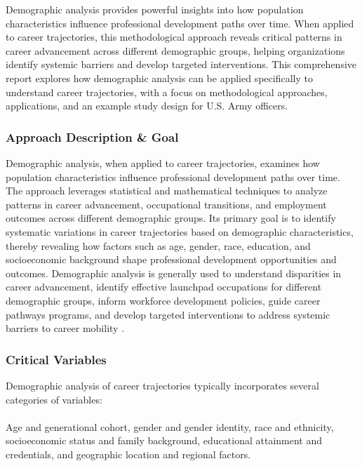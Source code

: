 \documentclass[../main.tex]{subfiles}
\begin{document}
Demographic analysis provides powerful insights into how population characteristics influence professional development paths over time. When applied to career trajectories, this methodological approach reveals critical patterns in career advancement across different demographic groups, helping organizations identify systemic barriers and develop targeted interventions. This comprehensive report explores how demographic analysis can be applied specifically to understand career trajectories, with a focus on methodological approaches, applications, and an example study design for U.S. Army officers.

\subsubsection{Approach Description \& Goal}

Demographic analysis, when applied to career trajectories, examines how population characteristics influence professional development paths over time. The approach leverages statistical and mathematical techniques to analyze patterns in career advancement, occupational transitions, and employment outcomes across different demographic groups. Its primary goal is to identify systematic variations in career trajectories based on demographic characteristics, thereby revealing how factors such as age, gender, race, education, and socioeconomic background shape professional development opportunities and outcomes. Demographic analysis is generally used to understand disparities in career advancement, identify effective launchpad occupations for different demographic groups, inform workforce development policies, guide career pathways programs, and develop targeted interventions to address systemic barriers to career mobility \citep{dol2023building, nataraj2018career}.

\subsubsection{Critical Variables}

Demographic analysis of career trajectories typically incorporates several categories of variables:

\paragraph{} Age and generational cohort, gender and gender identity, race and ethnicity, socioeconomic status and family background, educational attainment and credentials, and geographic location and regional factors.
\end{document}

